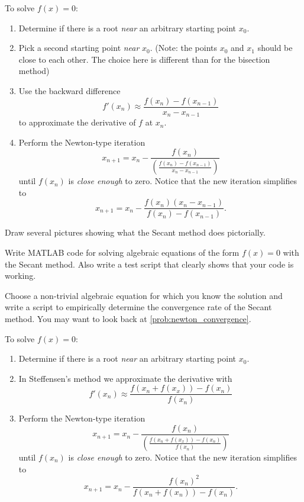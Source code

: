 \begin{algorithm}
    To solve $f(x) = 0$:
    \begin{enumerate}
        \item Determine if there is a root {\it near} an arbitrary starting point $x_0$.
        \item Pick a second starting point {\it near} $x_0$. (Note: the points $x_0$ and
            $x_1$ should be close to each other.  The choice here is different than for
            the bisection method)
        \item Use the backward difference 
            \[ f'(x_n) \approx \frac{f(x_n) - f(x_{n-1})}{x_n - x_{n-1}} \]
            to approximate the derivative of $f$ at $x_n$.
        \item Perform the Newton-type iteration 
            \[ x_{n+1} = x_n - \frac{f(x_n)}{ \left(  \frac{f(x_n) - f(x_{n-1})}{x_n - x_{n-1}}\right)} \]
            until $f(x_n)$ is {\it close enough} to zero.  Notice that the new iteration
            simplifies to
            \[ x_{n+1} = x_n - \frac{f(x_n)\left( x_n - x_{n-1} \right)}{f(x_n) -
            f(x_{n-1})}. \]
    \end{enumerate}
\end{algorithm}

\begin{problem}
    Draw several pictures showing what the Secant method does pictorially.
\end{problem}

\begin{problem}
    Write MATLAB code for solving algebraic equations of the form $f(x) = 0$ with the
    Secant method.  Also write a test script that clearly shows that your code is working.
\end{problem}

\begin{problem}
    Choose a non-trivial algebraic equation for which you know the solution and write a
    script to empirically determine the convergence rate of the Secant method.  You may want to
    look back at \ref{prob:newton_convergence}.
\end{problem}


\begin{algorithm}
    To solve $f(x) = 0$:
    \begin{enumerate}
        \item Determine if there is a root {\it near} an arbitrary starting point $x_0$.
        \item In Steffensen's method we approximate the derivative with 
            \[ f'(x_n) \approx \frac{f(x_n + f(x_x)) - f(x_n)}{f(x_n)} \]
        \item Perform the Newton-type iteration 
            \[ x_{n+1} = x_n - \frac{f(x_n)}{ \left(  \frac{f(x_n + f(x_x)) - f(x_n)}{f(x_n)}\right)} \]
            until $f(x_n)$ is {\it close enough} to zero.  Notice that the new iteration
            simplifies to
            \[ x_{n+1} = x_n - \frac{f(x_n)^2}{f(x_n + f(x_n)) -
            f(x_{n})}. \]
    \end{enumerate}
\end{algorithm}


